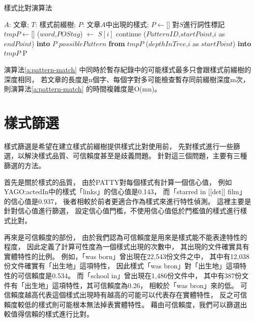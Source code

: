 \begin{algorithm}
    \caption{樣式比對演算法}
    \label{a:pattern-match}
    \begin{algorithmic}[1]
        \Require  
            $A$: 文章;
            $T$: 樣式前綴樹;
        \Ensure
            $P$: 文章$A$中出現的樣式;
        \State $P\gets$[]
            \State 對$S$進行詞性標記
            \State $tmpP\gets$[]
                \State ($word$,$POStag$) $\gets$ $S[i]$
                        \State continue
                    \Else
                             ($PatternID$,$startPoint$,$i$ as $endPoint$) {\bf into} $P$
                        \EndIf
                         $possiblePattern$ {\bf from} $tmpP$
                    \EndIf
                \EndFor
                 ($depthInTree$,$i$ as $startPoint$) {\bf into} $tmpP$
                \EndIf
            \EndFor
        \EndFor
        \State \Return P
    \end{algorithmic}
\end{algorithm}

演算法\ref{a:pattern-match} 中同時於暫存紀錄中的可能樣式最多只會跟樣式前綴樹的深度相同，
若文章的長度是n個字、每個字對多可能檢查暫存同前綴樹深度m次，
則演算法\ref{a:pattern-match} 的時間複雜度是O(mn)。

\section{樣式篩選}
\label{s:select-pattern}
樣式篩選是希望在建立樣式前綴樹提供樣式比對使用前，
先對樣式進行一些篩選，以解決樣式品質、可信賴度甚至是歧義問題。
針對這三個問題，主要有三種篩選的方法。

首先是關於樣式的品質，
由於PATTY對每個樣式有計算一個信心值，
例如YAGO:actedIn中的樣式「links」的信心值是0.143，
而「starred in [[det]] film」的信心值是0.937，
後者相較於前者更適合作為樣式來進行特性偵測。
這裡主要是針對信心值進行篩選，
設定信心值門檻，不使用信心值低於門檻值的樣式進行樣式比對。

再來是可信賴度的部份，
由於我們認為可信賴度是用來是樣式能不能表達特性的程度，
因此定義了計算可性度為一個樣式出現的次數中，
其出現的文件確實具有實體特性的比例。
例如，「was born」曾出現在22,543份文件之中，
其中有12,038份文件確實有「出生地」這項特性，
因此樣式「was bron」對「出生地」這項特性的可信賴度是0.534。
而「school in」曾出現在1,486份文件中，
其中有387份文件有「出生地」這項特性，其可信賴度為0.26，
相較於「was bron」來的低。
可信賴度越高代表這個樣式出現時有越高的可能可以代表存在實體特性，
反之可信賴度較低的樣式則可能根本無法掉表實體特性。
藉由可信賴度，我們可以篩選出較值得信賴的樣式進行比對。

